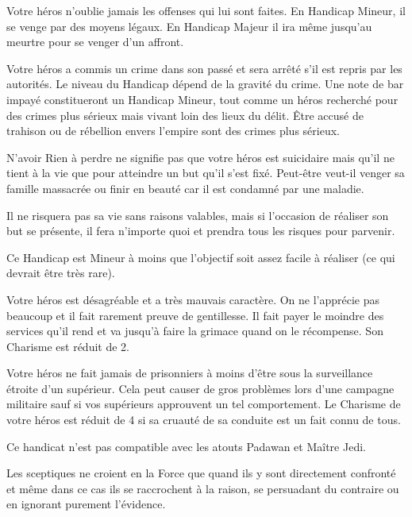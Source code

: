 \begin{description}[align=left]
    \item [Rancunier (Mineur ou Majeur)]
        Votre héros n'oublie jamais les offenses qui lui sont faites. En Handicap Mineur, il se venge par des moyens légaux. En Handicap Majeur il ira même jusqu'au meurtre pour se venger d'un affront.

    \item [Recherché (Mineur ou Majeur)]
        Votre héros a commis un crime dans son passé et sera arrêté s'il est repris par les autorités. Le niveau du Handicap dépend de la gravité du crime. Une note de bar impayé constitueront un Handicap Mineur, tout comme un héros recherché pour des crimes plus sérieux mais vivant loin des lieux du délit. Être accusé de trahison ou de rébellion envers l'empire sont des crimes plus sérieux.

    \item [Rien à perdre (Mineur)]
        N’avoir Rien à perdre ne signifie pas que votre héros est suicidaire mais qu'il ne tient à la vie que pour atteindre un but qu'il s'est fixé. Peut-être veut-il venger sa famille massacrée ou finir en beauté car il est condamné par une maladie.

        Il ne risquera pas sa vie sans raisons valables, mais si l'occasion de réaliser son but se présente, il fera n'importe quoi et prendra tous les risques pour parvenir. 

        Ce Handicap est Mineur à moins que l'objectif soit assez facile à réaliser (ce qui devrait être très rare).

    \item [Sale caractère (Mineur)]
        Votre héros est désagréable et a très mauvais caractère. On ne l'apprécie pas beaucoup et il fait rarement preuve de gentillesse. Il fait payer le moindre des services qu'il rend et va jusqu'à faire la grimace quand on le récompense. Son Charisme est réduit de 2.

    \item [Sanguinaire (Majeur)]
        Votre héros ne fait jamais de prisonniers à moins d'être sous la surveillance étroite d'un supérieur. Cela peut causer de gros problèmes lors d'une campagne militaire sauf si vos supérieurs approuvent un tel comportement. Le Charisme de votre héros est réduit de 4 si sa cruauté de sa conduite est un fait connu de tous.

        Ce handicat n'est pas compatible avec les atouts Padawan et Maître Jedi.

    \item [Sceptique (Mineur)]
        Les sceptiques ne croient en la Force que quand ils y sont directement confronté et même dans ce cas ils se raccrochent à la raison, se persuadant du contraire ou en ignorant purement l'évidence.


\end{description}
